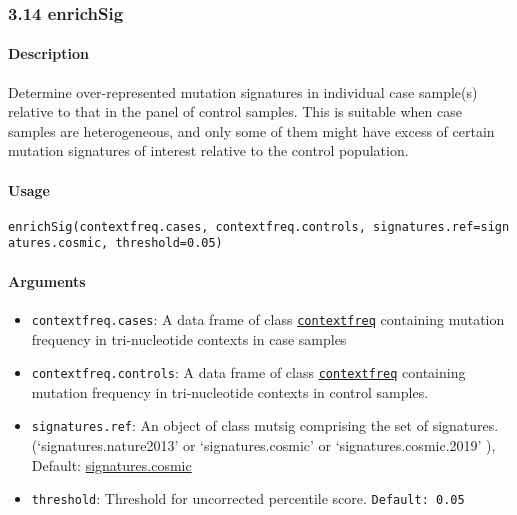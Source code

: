\documentclass[]{article}
\let\oldparagraph\paragraph
\renewcommand{\paragraph}[1]{\oldparagraph{#1}\mbox{}}
\begin{document}
\subsubsection{3.14 enrichSig}\label{enrichsig}

\paragraph{\texorpdfstring{\textbf{Description}}{Description}}\label{description-10}

Determine over-represented mutation signatures in individual case
sample(s) relative to that in the panel of control samples. This is
suitable when case samples are heterogeneous, and only some of them
might have excess of certain mutation signatures of interest relative to
the control population.

\paragraph{\texorpdfstring{\textbf{Usage}}{Usage}}\label{usage-12}

\texttt{enrichSig(contextfreq.cases,\ contextfreq.controls,\ signatures.ref=signatures.cosmic,\ threshold=0.05)}

\paragraph{\texorpdfstring{\textbf{Arguments
}}{Arguments }}\label{arguments-11}

\begin{itemize}
\item
  \texttt{contextfreq.cases}: A data frame of class
  \protect\hyperlink{contextfreq}{\texttt{contextfreq}} containing
  mutation frequency in tri-nucleotide contexts in case samples
\item
  \texttt{contextfreq.controls}: A data frame of class
  \protect\hyperlink{contextfreq}{\texttt{contextfreq}} containing
  mutation frequency in tri-nucleotide contexts in control samples.
\item
  \texttt{signatures.ref}: An object of class mutsig comprising the set of signatures. (`signatures.nature2013' or `signatures.cosmic' or `signatures.cosmic.2019' ), Default: \href{https://cran.r-project.org/web/packages/deconstructSigs/deconstructSigs.pdf}{signatures.cosmic} 
\item
  \texttt{threshold}: Threshold for uncorrected percentile score.
  \texttt{Default:\ 0.05}
\end{itemize}
\end{document}
